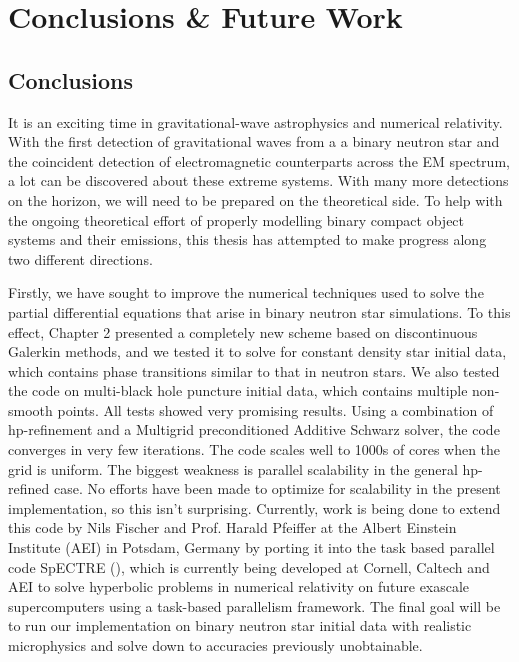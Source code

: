 \chapter{Conclusions \& Future Work}
\label{chap:conc}

\section{Conclusions}

It is an exciting time in gravitational-wave astrophysics and numerical relativity. With the first detection of gravitational waves from a a binary neutron star and the coincident detection of electromagnetic counterparts across the EM spectrum, a lot can be discovered about these extreme systems. With many more detections on the horizon, we will need to be prepared on the theoretical side. To help with the ongoing theoretical effort of properly modelling binary compact object systems and their emissions, this thesis has attempted to make progress along two different directions.

Firstly, we have sought to improve the numerical techniques used to solve the partial differential equations that arise in binary neutron star simulations. To this effect, Chapter 2 presented a completely new scheme based on discontinuous Galerkin methods, and we tested it to solve for constant density star initial data, which contains phase transitions similar to that in neutron stars. We also tested the code on multi-black hole puncture initial data, which contains multiple non-smooth points. All tests showed very promising results. Using a combination of hp-refinement and a Multigrid preconditioned Additive Schwarz solver, the code converges in very few iterations. The code scales well to 1000s of cores when the grid is uniform. The biggest weakness is parallel scalability in the general hp-refined case. No efforts have been made to optimize for scalability in the present implementation, so this isn't surprising. Currently, work is being done to extend this code by Nils Fischer and Prof. Harald Pfeiffer at the Albert Einstein Institute (AEI) in Potsdam, Germany by porting it into the task based parallel code SpECTRE (\cite{kidder2016spectre}), which is currently being developed at Cornell, Caltech and AEI to solve hyperbolic problems in numerical relativity on future exascale supercomputers using a task-based parallelism framework. The final goal will be to run our implementation on binary neutron star initial data with realistic microphysics and solve down to accuracies previously unobtainable.

